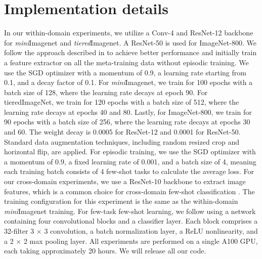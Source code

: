 \section{Implementation details}
In our within-domain experiments, we utilize a Conv-4 and ResNet-12 backbone for \textit{mini}Imagenet and \textit{tiered}Imagenet. A ResNet-50 is used for ImageNet-800. We follow the approach described in \cite{chen2021meta} to achieve better performance and initially train a feature extractor on all the meta-training data without episodic training. We use the SGD optimizer with a momentum of 0.9, a learning rate starting from 0.1, and a decay factor of 0.1. For \textit{mini}Imagenet, we train for 100 epochs with a batch size of 128, where the learning rate decays at epoch 90. For tieredImageNet, we train for 120 epochs with a batch size of 512, where the learning rate decays at epochs 40 and 80. Lastly, for ImageNet-800, we train for 90 epochs with a batch size of 256, where the learning rate decays at epochs 30 and 60. The weight decay is 0.0005 for ResNet-12 and 0.0001 for  ResNet-50. Standard data augmentation techniques, including random resized crop and horizontal flip, are applied. For episodic training, we use the SGD optimizer with a momentum of 0.9, a fixed learning rate of 0.001, and a batch size of 4, meaning each training batch consists of 4 few-shot tasks to calculate the average loss.
%
For our cross-domain experiments, we use a ResNet-10 backbone to extract image features, which is a common choice for cross-domain few-shot classification \cite{ye20, guo2020broader}. The training configuration for this experiment is the same as the within-domain \textit{mini}Imagenet training. 
%
For few-task few-shot learning, we follow \cite{yao2021meta} using a network containing four convolutional blocks and a classifier layer. Each block comprises a 32-filter 3 {$\times$} 3 convolution, a batch normalization layer, a ReLU nonlinearity, and a 2 {$\times$} 2 max pooling layer.
All experiments are performed on a single A100 GPU, each taking approximately 20 hours.
We will release all our code.


